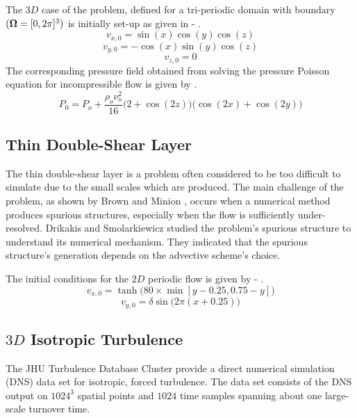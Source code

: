 The $3D$ case of the problem, defined for a tri-periodic domain with boundary $(\bm{\Omega} = [0, 2\pi]^3)$ is initially set-up as given in  - .
\begin{equation}
    v_{x, 0} = \sin(x) \cos(y) \cos(z)
    \label{eq:3d-tgv-vx}
\end{equation}
\begin{equation}
    v_{y, 0} = -\cos(x) \sin(y) \cos(z)
    \label{eq:3d-tgv-vy}
\end{equation}
\begin{equation}
    v_{z, 0} = 0
    \label{eq:3d-tgv-vz}
\end{equation}
The corresponding pressure field obtained from solving the pressure Poisson equation for incompressible flow is given by  \parencite{pereira2021modeling}.
\begin{equation}
    P_{0} = P_o + \frac{\rho_o \nu_o^2}{16} \bigg(2 + \cos(2z) \bigg) \bigg(\cos(2x) + \cos(2y) \bigg)
    \label{eq:3d-tgv-p}
\end{equation}

\subsection{Thin Double-Shear Layer}
The thin double-shear layer is a problem often considered to be too difficult to simulate due to the small scales which are produced. 
The main challenge of the problem, as shown by Brown and Minion \parencite{minion1997performance}, occurs when a numerical method produces spurious structures, especially when the flow is sufficiently under-resolved. 
Drikakis and Smolarkiewicz \parencite{drikakis2001spurious} studied the problem's spurious structure to understand its numerical mechanism. They indicated that the spurious structure's generation depends on the advective scheme's choice. 

The initial conditions for the $2D$ periodic flow is given by  - .
\begin{equation}
    v_{x, 0} = \tanh \big(80 \times \min[y-0.25, 0.75-y] \big)
    \label{eq:2d-tdsl-vx}
\end{equation}
\begin{equation}
    v_{y, 0} = \delta \sin \big( 2\pi (x+0.25) \big)
    \label{eq:2d-tdsl-vy}
\end{equation}

\subsection{$3D$ Isotropic Turbulence}
The JHU Turbulence Database Cluster \parencite{li2008public} provide a direct numerical simulation (DNS) data set for isotropic, forced turbulence. The data set consists of the DNS output on $1024^3$ spatial points and $1024$ time samples spanning about one large-scale turnover time.

